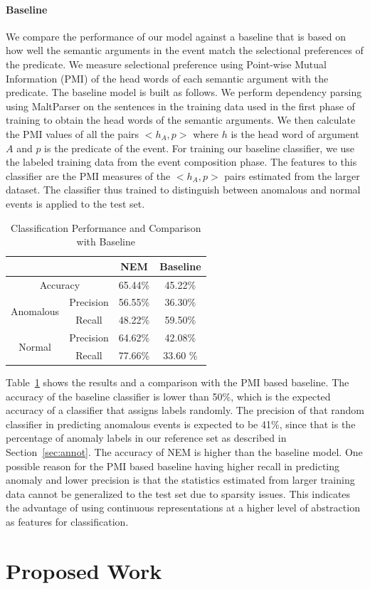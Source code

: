 \paragraph{Baseline} We compare the performance of our model against a baseline that is based
on how well the semantic arguments in the event match the selectional preferences 
of the predicate.  We measure selectional preference using Point-wise Mutual Information
(PMI) \cite{church1990word} of the head words of each semantic argument with the predicate.  
The baseline model is built as follows.  We perform dependency parsing using MaltParser
\cite{nivre2007maltparser} on the sentences in the training data used in the first phase of training to
obtain the head words of the semantic arguments.  We then calculate the PMI values of all the pairs
$<h_A, p>$ where $h$ is the head word of argument $A$ and $p$ is the predicate of the event.  
For training our baseline classifier, we use the labeled training data from the event composition phase.
The features to this classifier are the PMI measures of the $<h_A, p>$ pairs estimated from the larger
dataset.  The classifier thus trained to distinguish between anomalous and normal events is applied to the test set.
\begin{table}
\begin{center}
  \begin{tabular}[c]{|c|c|c|c|}
 \cline{3-4}
 \multicolumn{2}{c|}{}& \textbf{NEM} & \textbf{Baseline} \\
 \hline
 \multicolumn{2}{|c|}{Accuracy} & 65.44\% & 45.22\%\\
 \hline
 \multirow{2}{*}{Anomalous} & Precision & 56.55\% & 36.30\% \\
 \cline{2-4}
 & Recall & 48.22\% & 59.50\%\\
 \hline
 \multirow{2}{*}{Normal} & Precision & 64.62\% & 42.08\% \\
 \cline{2-4}
 & Recall & 77.66\% & 33.60 \%\\
 \hline
  \end{tabular}
\end{center}
 \caption{Classification Performance and Comparison with Baseline}
 \label{table:res1}
\end{table}

Table~\ref{table:res1} shows the results and a comparison with the PMI based baseline.  The accuracy of the 
baseline classifier is lower than 50\%, which is the expected accuracy of a classifier that assigns labels randomly.  
The precision of that random classifier in predicting anomalous events is expected to be 41\%, since 
that is the percentage of anomaly labels in our reference set as described in
Section~\ref{sec:annot}.  The accuracy of NEM is higher than the baseline model.
One possible reason for the PMI based baseline having higher recall in 
predicting anomaly and lower precision is that the statistics estimated from larger training data cannot
be generalized to the test set due to sparsity issues.  This indicates the advantage of using continuous
representations at a higher level of abstraction as features for classification.

\section{Proposed Work}
